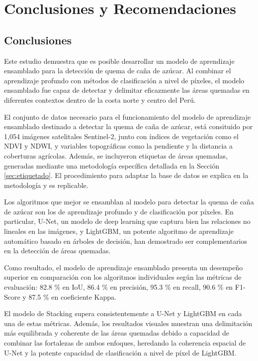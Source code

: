 \section{Conclusiones y Recomendaciones}
\subsection{Conclusiones}

Este estudio demuestra que es posible desarrollar un modelo de aprendizaje ensamblado para la detección 
de quema de caña de azúcar. Al combinar el aprendizaje profundo con métodos de clasificación a nivel de píxeles, 
el modelo ensamblado fue capaz de detectar y delimitar eficazmente las áreas quemadas en diferentes contextos 
dentro de la costa norte y centro del Perú. 

El conjunto de datos necesario para el funcionamiento del modelo de aprendizaje ensamblado destinado a 
detectar la quema de caña de azúcar, está consituido por 1,054 imágenes satelitales Sentinel-2, junto con índices de vegetación 
como el NDVI y NDWI, y variables topográficas como la pendiente y la distancia a coberturas agrícolas. Además, se incluyeron 
etiquetas de áreas quemadas, generadas mediante una metodología específica detallada en la Sección \ref{sec:etiquetado}. El procedimiento 
para adaptar la base de datos se explica en la metodología y es replicable. 

Los algoritmos que mejor se ensamblan al modelo para detectar la quema de caña de azúcar son los de aprendizaje 
profundo y de clasificación por píxeles. En particular, U-Net, un modelo de deep learning que captura bien las relaciones no lineales 
en las imágenes, y LightGBM, un potente algoritmo de aprendizaje automático basado en árboles de decisión, han demostrado ser complementarios en la detección 
de áreas quemadas.

Como resultado, el modelo de aprendizaje ensamblado presenta un desempeño superior en comparación con los algoritmos individuales según las métricas de evaluación: 
82.8 \% en IoU, 86.4 \% en precisión, 95.3 \% en recall, 90.6 \% en F1-Score y 87.5 \% en coeficiente Kappa. 

El modelo de Stacking supera consistentemente a U-Net y LightGBM en cada una de estas 
métricas. Además, los resultados visuales muestran una delimitación más equilibrada y coherente de las áreas quemadas debido a capacidad de combinar las fortalezas de ambos enfoques, heredando la 
coherencia espacial de U-Net y la potente capacidad de clasificación a nivel de píxel de LightGBM.

